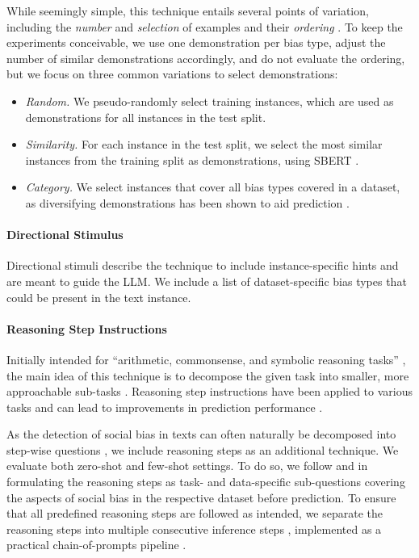 While seemingly simple, this technique entails several points of variation, including the \emph{number} and \emph{selection} of examples \cite{liu2022,zhang2022,levy2023,bertsch2024,dong2024} and their \emph{ordering} \cite{lu2022,shum2023,liu2024a}. To keep the experiments conceivable, we use one demonstration per bias type, adjust the number of similar demonstrations accordingly, and do not evaluate the ordering, but we focus on three common variations to select demonstrations:
\begin{itemize}
\setlength{\itemsep}{0pt}
    \item \emph{Random.} We pseudo-randomly select training instances, which are used as demonstrations for all instances in the test split.
    \item \emph{Similarity.} For each instance in the test split, we select the most similar instances from the training split as demonstrations, using SBERT \cite{reimers2019}.
    \item \emph{Category.} We select instances that cover all bias types covered in a dataset, as diversifying demonstrations has been shown to aid prediction \cite{levy2023,zhang2022}.
\end{itemize}



\paragraph{Directional Stimulus}
Directional stimuli \cite{li2023} describe the technique to include instance-specific hints and are meant to guide the LLM. We include a list of dataset-specific bias types that could be present in the text instance.



\paragraph{Reasoning Step Instructions}
Initially intended for ``arithmetic, commonsense, and symbolic reasoning tasks'' \cite{wei2022}, the main idea of this technique is to decompose the given task into smaller, more approachable sub-tasks \cite{dong2024}. Reasoning step instructions have been applied to various tasks and can lead to improvements in prediction performance \cite{wei2022}.

As the detection of social bias in texts can often naturally be decomposed into step-wise questions \cite{sap2020,zhou2023a}, we include reasoning steps as an additional technique. We evaluate both zero-shot and few-shot settings. To do so, we follow \citet{press2023} and \citet{zhou2022a} in formulating the reasoning steps as task- and data-specific sub-questions covering the aspects of social bias in the respective dataset before prediction. To ensure that all predefined reasoning steps are followed as intended, we separate the reasoning steps into multiple consecutive inference steps \cite{dong2024}, implemented as a practical chain-of-prompts pipeline \cite{zhou2022a}.





